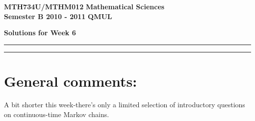 \documentclass[11pt,a4paper]{article}
\begin{document}
  \newpage
  \textbf{MTH734U/MTHM012} \hfill \textbf{Mathematical Sciences}\\
  \textbf{Semester B 2010 - 2011} \hfill \textbf{QMUL}
  \begin{center}
    \textbf{\huge Solutions for Week 6}
  \end{center}
  \hrule \vspace{2mm} \hrule
  \section*{General comments:}
  A bit shorter this week-there's only a limited selection of introductory questions on continuous-time Markov chains.
\end{document}
